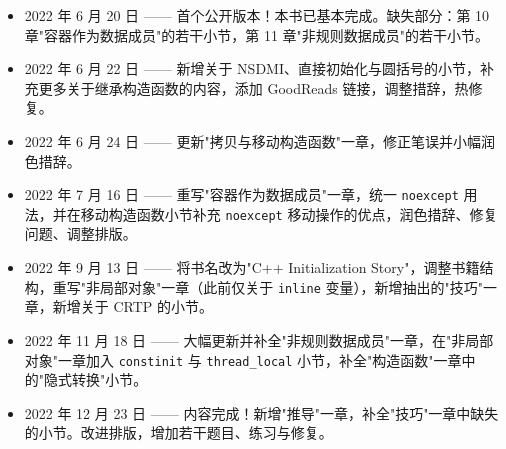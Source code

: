 \begin{itemize}
\item 2022 年 6 月 20 日 —— 首个公开版本！本书已基本完成。缺失部分：第 10 章"容器作为数据成员"的若干小节，第 11 章"非规则数据成员"的若干小节。
\item 2022 年 6 月 22 日 —— 新增关于 NSDMI、直接初始化与圆括号的小节，补充更多关于继承构造函数的内容，添加 GoodReads 链接，调整措辞，热修复。
\item 2022 年 6 月 24 日 —— 更新"拷贝与移动构造函数"一章，修正笔误并小幅润色措辞。
\item 2022 年 7 月 16 日 —— 重写"容器作为数据成员"一章，统一 \texttt{noexcept} 用法，并在移动构造函数小节补充 \texttt{noexcept} 移动操作的优点，润色措辞、修复问题、调整排版。
\item 2022 年 9 月 13 日 —— 将书名改为"C++ Initialization Story"，调整书籍结构，重写"非局部对象"一章（此前仅关于 \texttt{inline} 变量），新增抽出的"技巧"一章，新增关于 CRTP 的小节。
\item 2022 年 11 月 18 日 —— 大幅更新并补全"非规则数据成员"一章，在"非局部对象"一章加入 \texttt{constinit} 与 \texttt{thread\_local} 小节，补全"构造函数"一章中的"隐式转换"小节。
\item 2022 年 12 月 23 日 —— 内容完成！新增"推导"一章，补全"技巧"一章中缺失的小节。改进排版，增加若干题目、练习与修复。
\end{itemize}

